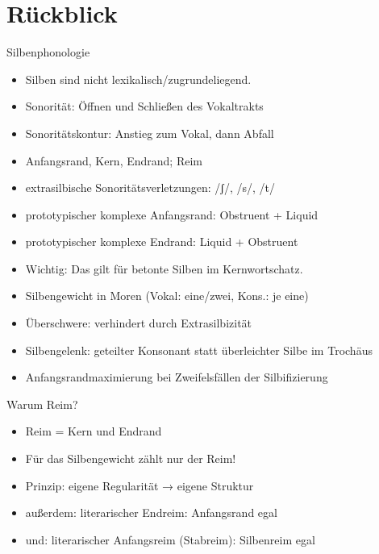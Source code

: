 
\section{Rückblick}

\begin{frame}
  {Silbenphonologie}
  \pause
  \begin{itemize}[<+->]
    \item Silben sind nicht lexikalisch\slash zugrundeliegend.
    \item Sonorität: Öffnen und Schließen des Vokaltrakts
    \item Sonoritätskontur: Anstieg zum Vokal, dann Abfall
    \item Anfangsrand, Kern, Endrand; Reim
    \item \alert{extrasilbische} Sonoritätsverletzungen: /ʃ/, /s/, /t/
    \item prototypischer komplexe Anfangsrand: \alert{Obstruent + Liquid}
    \item prototypischer komplexe Endrand: \alert{Liquid + Obstruent}
    \item Wichtig: \alert{Das gilt für betonte Silben im Kernwortschatz.}
    \item Silbengewicht in \alert{Moren} (Vokal: eine\slash zwei, Kons.: je eine)
    \item Überschwere: verhindert durch Extrasilbizität
    \item Silbengelenk: geteilter Konsonant statt überleichter Silbe im Trochäus
    \item Anfangsrandmaximierung bei Zweifelsfällen der Silbifizierung
  \end{itemize}
\end{frame}

\begin{frame}
  {Warum Reim?}
  \pause
  \begin{itemize}[<+->]
    \item Reim = Kern und Endrand
    \item \alert{Für das Silbengewicht zählt nur der Reim!}
    \item Prinzip: eigene Regularität → eigene Struktur
      \Zeile
    \item außerdem: literarischer \alert{Endreim}: \alert{Anfangsrand egal}
    \item und: literarischer \alert{Anfangsreim} (Stabreim): \alert{Silbenreim egal} 
  \end{itemize}
\end{frame}

